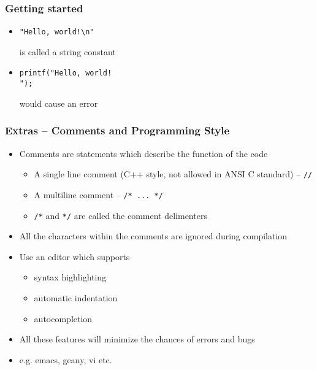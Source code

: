 \documentclass[11pt]{beamer}
\begin{document}
\begin{frame}[fragile]\frametitle{Getting started}
\label{sec-1-6}

\begin{itemize}
\item \begin{verbatim}
"Hello, world!\n"
\end{verbatim}
  is called a string constant
\item \begin{verbatim}
printf("Hello, world!
");
\end{verbatim}
  would cause an error
\end{itemize}
\end{frame}
\begin{frame}[fragile]\frametitle{Extras -- Comments and Programming Style}
\label{sec-1-7}

\begin{itemize}
\item Comments are statements which describe the function of the code
\begin{itemize}
\item A single line comment (C++ style, not allowed in ANSI C standard) -- \verb~//~
\item A multiline comment -- \verb~/* ... */~
\item \verb~/*~ and \verb~*/~ are called the comment delimenters
\end{itemize}
\item All the characters within the comments are ignored during compilation
\item Use an editor which supports
\begin{itemize}
\item syntax highlighting
\item automatic indentation
\item autocompletion
\end{itemize}
\item All these features will minimize the chances of errors and bugs
\item e.g. emacs, geany, vi etc.
\end{itemize}
 
\end{frame}
\end{document}
